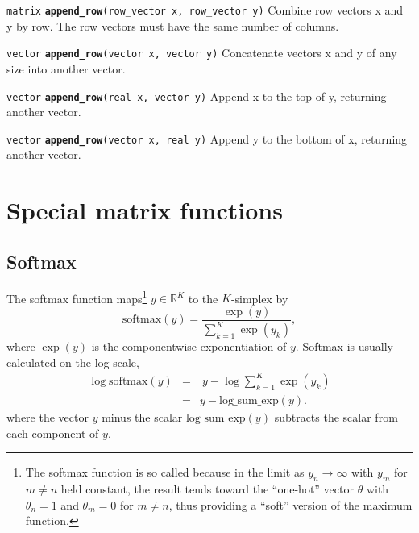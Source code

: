 \documentclass[
  10pt,
]{book}
\begin{document}

\texttt{matrix} \textbf{\texttt{append\_row}}\texttt{(row\_vector\ x,\ row\_vector\ y)}\newline
Combine row vectors x and y by row. The row vectors must have the same
number of columns.


\texttt{vector} \textbf{\texttt{append\_row}}\texttt{(vector\ x,\ vector\ y)}\newline
Concatenate vectors x and y of any size into another vector.


\texttt{vector} \textbf{\texttt{append\_row}}\texttt{(real\ x,\ vector\ y)}\newline
Append x to the top of y, returning another vector.


\texttt{vector} \textbf{\texttt{append\_row}}\texttt{(vector\ x,\ real\ y)}\newline
Append y to the bottom of x, returning another vector.

\hypertarget{softmax}{%
\section{Special matrix functions}\label{softmax}}

\hypertarget{softmax-1}{%
\subsection{Softmax}\label{softmax-1}}

The softmax function maps\footnote{The softmax function is so called because in the limit
  as \(y_n \rightarrow \infty\) with \(y_m\) for \(m \neq n\) held constant,
  the result tends toward the ``one-hot'' vector \(\theta\) with \(\theta_n = 1\) and \(\theta_m = 0\) for \(m \neq n\), thus providing a ``soft''
  version of the maximum function.} \(y \in \mathbb{R}^K\) to the
\(K\)-simplex by \[ \text{softmax}(y)  = \frac{\exp(y)}
{\sum_{k=1}^K \exp(y_k)}, \] where \(\exp(y)\) is the componentwise
exponentiation of \(y\). Softmax is usually calculated on the log scale,
\begin{eqnarray*} \log \text{softmax}(y) & = & \ y - \log \sum_{k=1}^K
\exp(y_k) \\[4pt] & = & y - \mathrm{log\_sum\_exp}(y). \end{eqnarray*}
where the vector \(y\) minus the scalar \(\mathrm{log\_sum\_exp}(y)\)
subtracts the scalar from each component of \(y\).
\end{document}
